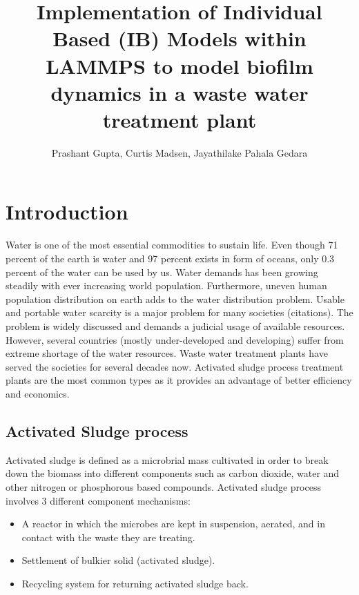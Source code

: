 \documentclass[11pt,a4paper,openright]{article}
\begin{document}
%
\title{Implementation of Individual Based (IB) Models within LAMMPS to model biofilm dynamics in a waste water treatment plant}
\author{Prashant Gupta, Curtis Madsen, Jayathilake Pahala Gedara}

\maketitle



\tableofcontents

\listoftables
\listoffigures


\cleardoublepage
\setcounter{page}{1}

\section{Introduction}

Water is one of the most essential commodities to sustain life. Even though 71 percent of the earth is water and 97 percent exists in form of oceans, only 0.3 percent of the water can be used by us. Water demands has been growing steadily with ever increasing world population. Furthermore, uneven human population distribution on earth adds to the water distribution problem. Usable and portable water scarcity is a major problem for many societies (citations). The problem is widely discussed and demands a judicial usage of available resources. However, several countries (mostly under-developed and developing) suffer from extreme shortage of the water resources. Waste water treatment plants have served the societies for several decades now. Activated sludge process treatment plants are the most common types as it provides an advantage of better efficiency and economics.

\subsection{Activated Sludge process}

Activated sludge is defined as a microbrial mass cultivated in order to break down the biomass into different components such as carbon dioxide, water and other nitrogen or phosphorous based compounds. Activated sludge process involves 3 different component mechanisms:

\begin{itemize}
\item A reactor in which the microbes are kept in suspension, aerated, and in contact with the waste they are treating.
\item Settlement of bulkier solid (activated sludge).
\item Recycling system for returning activated sludge back. 
\end{itemize}
\end{document}
